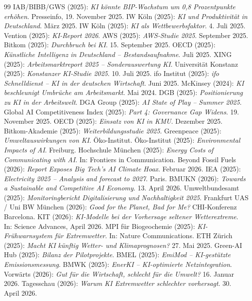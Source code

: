 \documentclass[12pt,a4paper]{article}
\begin{document}
\begin{thebibliography}{99}
		 IAB/BIBB/GWS (2025): \emph{KI könnte BIP-Wachstum um 0,8 Prozentpunkte erhöhen}. Presseinfo, 19. November 2025.
		 IW Köln (2025): \emph{KI und Produktivität in Deutschland}. März 2025.
		 IW Köln (2025): \emph{KI als Wettbewerbsfaktor}. 4. Juli 2025.
		 Vention (2025): \emph{KI-Report 2026}.
		 AWS (2025): \emph{AWS-Studie 2025}. September 2025.
		 Bitkom (2025): \emph{Durchbruch bei KI}. 15. September 2025.
		 OECD (2025): \emph{Künstliche Intelligenz in Deutschland – Bestandsaufnahme}. Juli 2025.
		 XING (2025): \emph{Arbeitsmarktreport 2025 – Sonderauswertung KI}.
		 Universität Konstanz (2025): \emph{Konstanzer KI-Studie 2025}. 10. Juli 2025.
		 ifo Institut (2025): \emph{ifo Schnelldienst – KI in der deutschen Wirtschaft}. Juni 2025.
		 McKinsey (2024): \emph{KI beschleunigt Umbrüche am Arbeitsmarkt}. Mai 2024.
		 DGB (2025): \emph{Positionierung zu KI in der Arbeitswelt}.
		 DGA Group (2025): \emph{AI State of Play – Summer 2025}.
		 Global AI Competitiveness Index (2025): \emph{Part 4: Governance Gap Widens}. 19. November 2025.
		 OECD (2025): \emph{Einsatz von KI in KMU}. Dezember 2025.
		 Bitkom-Akademie (2025): \emph{Weiterbildungsstudie 2025}.
		 Greenpeace (2025): \emph{Umweltauswirkungen von KI}. Öko-Institut.
		 Öko-Institut (2025): \emph{Environmental Impacts of AI}. Freiburg.
		 Hochschule München (2025): \emph{Energy Costs of Communicating with AI}. In: Frontiers in Communication.
		 Beyond Fossil Fuels (2026): \emph{Report Exposes Big Tech's AI Climate Hoax}. Februar 2026.
		 IEA (2025): \emph{Electricity 2025 – Analysis and forecast to 2027}. Paris.
		 BMUKN (2026): \emph{Towards a Sustainable and Competitive AI Economy}. 13. April 2026.
		 Umweltbundesamt (2025): \emph{Monitoringbericht Digitalisierung und Nachhaltigkeit 2025}.
		 Frankfurt UAS / Uni BW München (2026): \emph{Good for the Planet, Bad for Me?} CHI-Konferenz Barcelona.
		 KIT (2026): \emph{KI-Modelle bei der Vorhersage seltener Wetterextreme}. In: Science Advances, April 2026.
		 MPI für Biogeochemie (2025): \emph{KI-Frühwarnsystem für Extremwetter}. In: Nature Communications.
		 ETH Zürich (2025): \emph{Macht KI künftig Wetter- und Klimaprognosen?} 27. Mai 2025.
		 Green-AI Hub (2025): \emph{Bilanz der Pilotprojekte}.
		 BMEL (2025): \emph{EmiMod – KI-gestützte Emissionsmessung}.
		 BMWK (2025): \emph{EnerKI – KI-optimierte Netzintegration}.
		 Vorwärts (2026): \emph{Gut für die Wirtschaft, schlecht für die Umwelt?} 16. Januar 2026.
		 Tagesschau (2026): \emph{Warum KI Extremwetter schlechter vorhersagt}. 30. April 2026.
		

\end{thebibliography}
\end{document}
